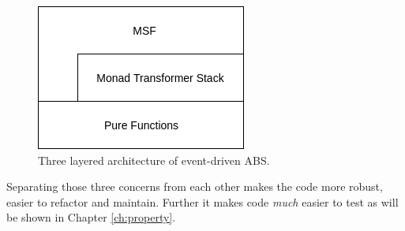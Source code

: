 \begin{figure}
	\centering
	\includegraphics[width=.4\textwidth, angle=0]{./fig/eventdriven/3layers.png}
	\caption[Three layered architecture of event-driven ABS]{Three layered architecture of event-driven ABS.}
	\label{fig:3layer_system}
\end{figure}

Separating those three concerns from each other makes the code more robust, easier to refactor and maintain. Further it makes code \textit{much} easier to test as will be shown in Chapter \ref{ch:property}. 

